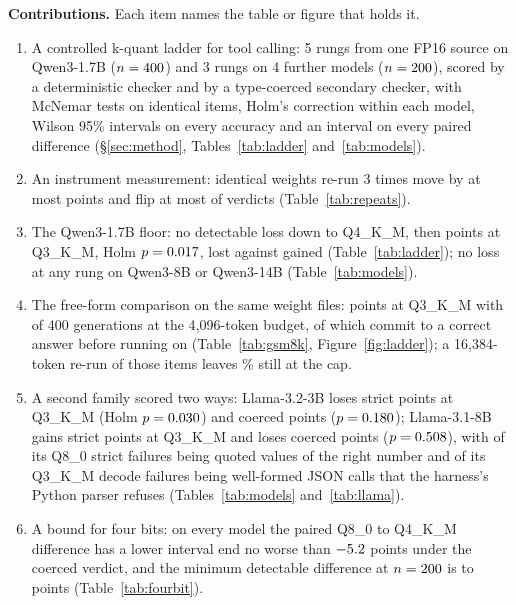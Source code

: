 \documentclass[12pt,letterpaper]{article}
\newcommand{\qm}{Qwen3-1.7B}
\begin{document}
\textbf{Contributions.} Each item names the table or figure that holds it.
\begin{enumerate}\setlength{\itemsep}{0pt}
\item A controlled k-quant ladder for tool calling: 5 rungs from one FP16 source on \qm{} ($n=400{}$) and 3 rungs on 4 further models ($n=200{}$), scored by a deterministic checker and by a type-coerced secondary checker, with McNemar tests on identical items, Holm's correction within each model, Wilson 95\% intervals on every accuracy and an interval on every paired difference (\S\ref{sec:method}, Tables~\ref{tab:ladder} and~\ref{tab:models}).
\item An instrument measurement: identical weights re-run 3 times move by at most \qtMaxRepRange{} points and flip at most \qtRepFlipsMaxFour{} of \qtN{} verdicts (Table~\ref{tab:repeats}).
\item The \qm{} floor: no detectable loss down to Q4\_K\_M, then \qtDropThree{} points at Q3\_K\_M, Holm $p=0.017{}$, \qtLostThree{} lost against \qtGainedThree{} gained (Table~\ref{tab:ladder}); no loss at any rung on Qwen3-8B or Qwen3-14B (Table~\ref{tab:models}).
\item The free-form comparison on the same weight files: \qtGsmDropThree{} points at Q3\_K\_M with \qtGsmTruncThree{} of 400 generations at the 4{,}096-token budget, \qtGsmTruncCorrectThree{} of which commit to a correct answer before running on (Table~\ref{tab:gsm8k}, Figure~\ref{fig:ladder}); a 16{,}384-token re-run of those \qtBudOf{} items leaves \qtBudStillCapPct{}\% still at the cap.
\item A second family scored two ways: Llama-3.2-3B loses \qtDropLlamaThreeBThree{} strict points at Q3\_K\_M (Holm $p=0.030{}$) and \qtCoercedDropLlamaThreeBThree{} coerced points ($p=0.180{}$); Llama-3.1-8B gains \qtDropLlamaEightBThree{} strict points at Q3\_K\_M and loses \qtCoercedDropLlamaEightBThree{} coerced points ($p=0.508{}$), with \qtCoercibleLlamaEightBEight{} of its \qtFailsLlamaEightBEight{} Q8\_0 strict failures being quoted values of the right number and \qtDecodeJsonLlamaEightBThree{} of its \qtDecodeErrLlamaEightBThree{} Q3\_K\_M decode failures being well-formed JSON calls that the harness's Python parser refuses (Tables~\ref{tab:models} and~\ref{tab:llama}).
\item A bound for four bits: on every model the paired Q8\_0 to Q4\_K\_M difference has a lower interval end no worse than $-5.2{}$ points under the coerced verdict, and the minimum detectable difference at $n=200{}$ is \qtFourBitMdeMin{} to \qtFourBitMdeMax{} points (Table~\ref{tab:fourbit}).

\end{enumerate}
\end{document}
